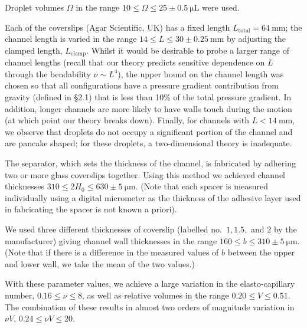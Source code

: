 Droplet volumes $\Omega$ in the range $10 \leq \Omega \leq 25 \pm 0.5~\si{\micro}\si{\liter}$ were used.

Each of the coverslips (Agar Scientific, UK) has a fixed length $L_{\text{total}} = 64~\si{\milli\meter}$; the channel length is varied in the range $14 \leq L \leq 30 \pm 0.25~\si{\milli\meter}$ by adjusting the clamped length, $L_{\text{clamp}}$. Whilst it would be desirable to probe a larger range of channel lengths (recall that our theory predicts sensitive dependence on $L$ through the bendability $\nu \sim L^4$), the upper bound on the channel length was chosen so that all configurations have a  pressure gradient contribution from gravity (defined in \S2.1) that is less than 10\% of the total pressure gradient. In addition, longer channels are more likely to have walls touch during the motion (at which point our theory breaks down). Finally, for channels with $L < 14~\si{\milli \meter}$, we observe that droplets do not occupy a significant portion of the channel and are pancake shaped; for these droplets, a two-dimensional theory is inadequate.

The separator, which sets the thickness of the channel, is fabricated by adhering two or more glass coverslips together. Using this method we achieved channel thicknesses  $310 \leq 2 H_0 \leq 630 \pm 5~\si{\micro}\si{\meter}$. (Note that each spacer is measured individually using a digital micrometer as the thickness of the adhesive layer used in fabricating the spacer is not known a priori).

We used three different thicknesses of coverslip (labelled no.~$1,1.5,$ and $2$ by the manufacturer) giving channel wall thicknesses in the range $160 \leq b \leq 310 \pm 5~\si{\micro}\si{\meter}$. (Note that if there is a difference in the measured values of $b$ between the upper and lower wall, we take the mean of the two values.)

With these parameter values, we achieve a large variation in the elasto-capillary number, $0.16 \leq \nu \leq 8$, as well as relative volumes in the range $0.20 \leq V \leq 0.51$. The combination of these results in almost two orders of magnitude variation in $\nu V$,  $0.24 \leq \nu V \leq 20$.

